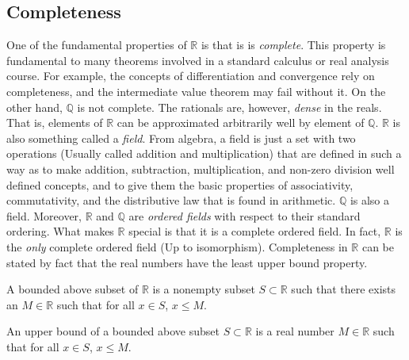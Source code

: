 \documentclass[crop=false,class=book,oneside]{standalone}
\begin{document}
        \subsection{Completeness}
            One of the fundamental properties of $\mathbb{R}$ is
            that is is \textit{complete}. This property is
            fundamental to many theorems involved in a
            standard calculus or real analysis course. For
            example, the concepts of differentiation and
            convergence rely on completeness, and the
            intermediate value theorem may fail without it.
            On the other hand, $\mathbb{Q}$ is not complete. The
            rationals are, however, \textit{dense} in the reals.
            That is, elements of $\mathbb{R}$ can be
            approximated arbitrarily well by element of
            $\mathbb{Q}$. $\mathbb{R}$ is also something
            called a \textit{field}. From algebra,
            a field is just a
            set with two operations (Usually called addition
            and multiplication) that are defined in such
            a way as to make addition, subtraction,
            multiplication, and non-zero division
            well defined concepts, and to give them the
            basic properties of associativity, commutativity,
            and the distributive law that is found in
            arithmetic. $\mathbb{Q}$ is also a field.
            Moreover, $\mathbb{R}$ and $\mathbb{Q}$ are
            \textit{ordered fields} with respect to
            their standard ordering. What makes
            $\mathbb{R}$ special is that it is a
            complete ordered field. In fact, $\mathbb{R}$
            is the \textit{only} complete ordered field
            (Up to isomorphism). Completeness in
            $\mathbb{R}$ can be stated by fact that the real
            numbers have the least upper bound property.
            \begin{definition}
                A bounded above subset of $\mathbb{R}$
                is a nonempty subset $S\subset{\mathbb{R}}$
                such that there exists an $M\in\mathbb{R}$
                such that for all $x\in{S}$, $x\leq{M}$.
            \end{definition}
            \begin{definition}
                An upper bound of a bounded above
                subset $S\subset\mathbb{R}$ is a real
                number $M\in\mathbb{R}$
                such that for all $x\in{S}$, $x\leq{M}$.
            \end{definition}
\end{document}
